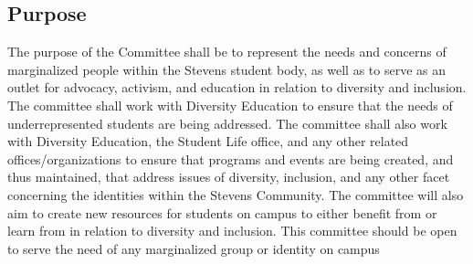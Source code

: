\documentclass[12pt]{scrreprt}
\begin{document}
\subsection{Purpose}
The purpose of the Committee shall be to represent the needs and concerns of marginalized people within the Stevens student body, as well as to serve as an outlet for advocacy, activism, and education in relation to diversity and inclusion. The committee shall work with Diversity Education to ensure that the needs of underrepresented students are being addressed.  The committee shall also work with Diversity Education, the Student Life office, and any other related offices/organizations to ensure that programs and events are being created, and thus maintained, that address issues of diversity, inclusion, and any other facet concerning the identities within the Stevens Community. The committee will also aim to create new resources for students on campus to either benefit from or learn from in relation to diversity and inclusion. This committee should be open to serve the need of any marginalized group or identity on campus
\end{document}
